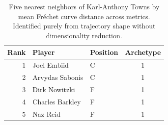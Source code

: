 \begin{table}[htbp]
  \centering\small
  \begin{tabular}{rllc}
    \toprule
    Rank & Player & Position & Archetype \\
    \midrule
    1 & Joel Embiid & C & 1 \\
    2 & Arvydas Sabonis & C & 1 \\
    3 & Dirk Nowitzki & F & 1 \\
    4 & Charles Barkley & F & 1 \\
    5 & Naz Reid & F & 1 \\
    \bottomrule
  \end{tabular}
  \caption{Five nearest neighbors of Karl-Anthony Towns by mean Fr\'{e}chet curve distance across metrics. Identified purely from trajectory shape without dimensionality reduction.}
  \label{tab:Karl_Anthony_Towns_frechet_curve_neighbors}
\end{table}

